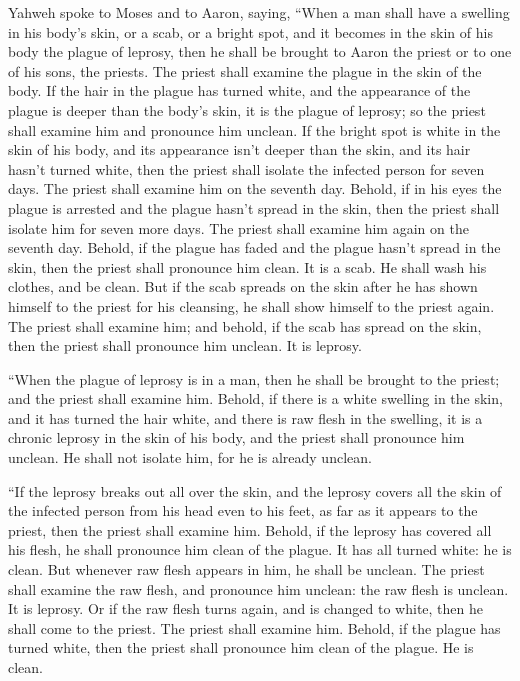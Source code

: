  Yahweh spoke to Moses and to Aaron, saying,
 ``When a man shall have a swelling in his body's skin, or
a scab, or a bright spot, and it becomes in the skin of his body the
plague of leprosy, then he shall be brought to Aaron the priest or to
one of his sons, the priests.  The priest shall examine
the plague in the skin of the body. If the hair in the plague has turned
white, and the appearance of the plague is deeper than the body's skin,
it is the plague of leprosy; so the priest shall examine him and
pronounce him unclean.  If the bright spot is white in the
skin of his body, and its appearance isn't deeper than the skin, and its
hair hasn't turned white, then the priest shall isolate the infected
person for seven days.  The priest shall examine him on
the seventh day. Behold, if in his eyes the plague is arrested and the
plague hasn't spread in the skin, then the priest shall isolate him for
seven more days.  The priest shall examine him again on
the seventh day. Behold, if the plague has faded and the plague hasn't
spread in the skin, then the priest shall pronounce him clean. It is a
scab. He shall wash his clothes, and be clean.  But if the
scab spreads on the skin after he has shown himself to the priest for
his cleansing, he shall show himself to the priest again. 
The priest shall examine him; and behold, if the scab has spread on the
skin, then the priest shall pronounce him unclean. It is leprosy.

 ``When the plague of leprosy is in a man, then he shall
be brought to the priest;  and the priest shall examine
him. Behold, if there is a white swelling in the skin, and it has turned
the hair white, and there is raw flesh in the swelling, 
it is a chronic leprosy in the skin of his body, and the priest shall
pronounce him unclean. He shall not isolate him, for he is already
unclean.

 ``If the leprosy breaks out all over the skin, and the
leprosy covers all the skin of the infected person from his head even to
his feet, as far as it appears to the priest,  then the
priest shall examine him. Behold, if the leprosy has covered all his
flesh, he shall pronounce him clean of the plague. It has all turned
white: he is clean.  But whenever raw flesh appears in
him, he shall be unclean.  The priest shall examine the
raw flesh, and pronounce him unclean: the raw flesh is unclean. It is
leprosy.  Or if the raw flesh turns again, and is changed
to white, then he shall come to the priest.  The priest
shall examine him. Behold, if the plague has turned white, then the
priest shall pronounce him clean of the plague. He is clean.

